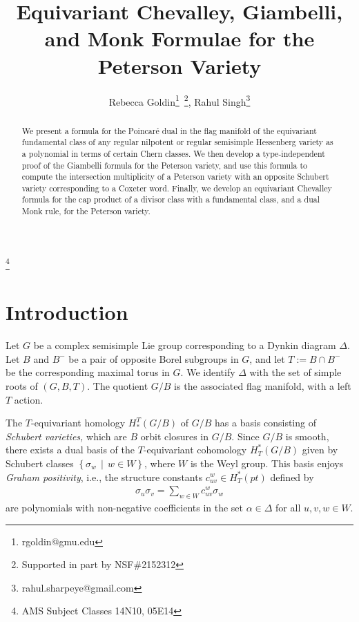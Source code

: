 \documentclass[10pt]{article}
\author{Rebecca Goldin\footnote{rgoldin@gmu.edu}\ \footnote{Supported in part by NSF\#2152312}, Rahul Singh\footnote{rahul.sharpeye@gmail.com}}
\numberwithin{thm}{section}
\theoremstyle{definition}
\theoremstyle{remark}
\newcommand{\set}[2]{\left\{#1\,\middle\vert\,#2\right\}}
\begin{document}
\title{Equivariant Chevalley, Giambelli, and Monk Formulae for the Peterson Variety}
\date{}
\maketitle

\begin{abstract}

We present a formula for the Poincar\'e dual in the flag manifold of the equivariant fundamental class of any regular nilpotent or regular semisimple Hessenberg variety as a polynomial in terms of certain Chern classes.
We then develop a type-independent proof of the Giambelli formula for the Peterson variety,
and use this formula to compute the intersection multiplicity of a Peterson variety with an opposite Schubert variety corresponding to a Coxeter word.
Finally, we develop an equivariant Chevalley formula for the cap product of a divisor class with a fundamental class,
and a dual Monk rule, for the Peterson variety.
\end{abstract}

\let\thefootnote\relax\footnote{AMS Subject Classes 14N10, 05E14}
\section{Introduction}
Let $G$ be a complex semisimple Lie group
corresponding to a Dynkin diagram $\Delta$. 
Let $B$ and $B^-$ be a pair of opposite Borel subgroups in $G$,
and let $T:= B \cap B^-$ be the corresponding maximal torus in $G$.
We identify $\Delta$ with the set of simple roots of $(G,B,T)$.
The quotient $G/B$ is the associated flag manifold, with a left $T$ action.

The $T$-equivariant homology $H_*^T(G/B)$ of $G/B$ has a basis consisting of {\em Schubert varieties,} which are $B$ orbit closures in $G/B$.
Since $G/B$ is smooth, there exists a dual basis of the $T$-equivariant cohomology $H_T^*(G/B)$
given by Schubert classes $\set{\sigma_w}{w\in W}$, where $W$ is the Weyl group.
This basis enjoys  {\em Graham positivity}, i.e., the structure constants $c_{uv}^w\in H_T^*(pt)$ defined by 
\begin{align*}
\sigma_u\sigma_v = \sum_{w\in W} c_{uv}^w \sigma_w
\end{align*}
are polynomials with non-negative coefficients in the set $\alpha\in \Delta$ for all $u,v,w\in W$.
\end{document}

